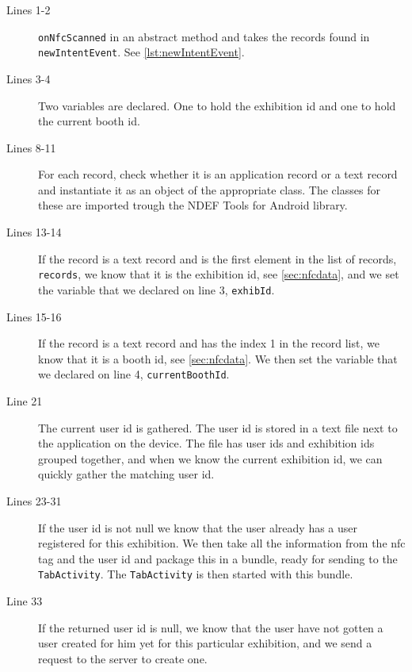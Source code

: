 \begin{description}
\item[Lines 1-2] \lstinline|onNfcScanned| in an abstract method and takes the records found in \lstinline|newIntentEvent|. See \autoref{lst:newIntentEvent}.
\item[Lines 3-4] Two variables are declared. One to hold the exhibition id and one to hold the current booth id.
\item[Lines 8-11] For each record, check whether it is an application record or a text record and instantiate it as an object of the appropriate class. The classes for these are imported trough the NDEF Tools for Android \citep{ndeftools} library.
\item[Lines 13-14] If the record is a text record and is the first element in the list of records, \lstinline|records|, we know that it is the exhibition id, see \autoref{sec:nfcdata}, and we set the variable that we declared on line 3, \lstinline|exhibId|.
\item[Lines 15-16] If the record is a text record and has the index 1 in the record list, we know that it is a booth id, see \autoref{sec:nfcdata}. We then set the variable that we declared on line 4, \lstinline|currentBoothId|.
\item[Line 21] The current user id is gathered. The user id is stored in a text file next to the application on the device. The file has user ids and exhibition ids grouped together, and when we know the current exhibition id, we can quickly gather the matching user id.
\item[Lines 23-31] If the user id is not null we know that the user already has a user registered for this exhibition. We then take all the information from the \ac{nfc} tag and the user id and package this in a bundle, ready for sending to the \lstinline|TabActivity|. The \lstinline|TabActivity| is then started with this bundle.
\item[Line 33] If the returned user id is null, we know that the user have not gotten a user created for him yet for this particular exhibition, and we send a request to the server to create one.
\end{description}


